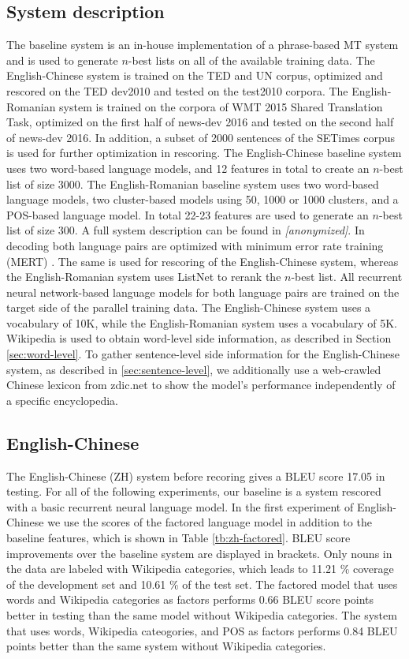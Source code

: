 \documentclass[a4paper]{article}
\newcommand{\anony}[1]{\textit{[anonymized]}}
\begin{document}
\subsection{System description}
The baseline system is an in-house implementation of a phrase-based MT system and is used to generate $n$-best lists on all of the available training data. The English-Chinese system is trained on the TED and UN corpus, optimized and rescored on the TED dev2010 and tested on the test2010 corpora.
The English-Romanian system is trained on the corpora of WMT 2015 Shared Translation Task, optimized on the first half of news-dev 2016 and tested on the second half of news-dev 2016. In addition, a subset of 2000 sentences of the SETimes corpus is used for further optimization in rescoring.
The English-Chinese baseline system uses two word-based language models, and 12 features in total to create an $n$-best list of size 3000.
The English-Romanian baseline system uses two word-based language models, two cluster-based models using 50, 1000 or 1000 clusters, and a POS-based language model. In total 22-23 features are used to generate an $n$-best list of size 300. A full system description can be found in \anony{niehuesusing}.
In decoding both language pairs are optimized with minimum error rate training (MERT) \cite{och2003minimum}. The same is used for rescoring of the English-Chinese system, whereas the English-Romanian system uses ListNet to rerank the $n$-best list.
All recurrent neural network-based language models for both language pairs are trained on the target side of the parallel training data. The English-Chinese system uses a vocabulary of 10K, while the English-Romanian system uses a vocabulary of 5K. Wikipedia is used to obtain word-level side information, as described in Section \ref{sec:word-level}.
To gather sentence-level side information for the English-Chinese system, as described in \ref{sec:sentence-level}, we additionally use a web-crawled Chinese lexicon from zdic.net \cite{zdic} to show the model's performance independently of a specific encyclopedia.


\subsection{English-Chinese}
The English-Chinese (ZH) system before recoring gives a BLEU score 17.05 in testing. For all of the following experiments, our baseline is a system rescored with a basic recurrent neural language model.
In the first experiment of English-Chinese we use the scores of the factored language model in addition to the baseline features, which is shown in Table \ref{tb:zh-factored}. BLEU score improvements over the baseline system are displayed in brackets. Only nouns in the data are labeled with Wikipedia categories, which leads to 11.21 \% coverage of the development set and 10.61 \% of the test set. The factored model that uses words and Wikipedia categories as factors performs 0.66 BLEU score points better in testing than the same model without Wikipedia categories. The system that uses words, Wikipedia cateogories, and POS as factors performs 0.84 BLEU points better than the same system without Wikipedia categories.
\end{document}
